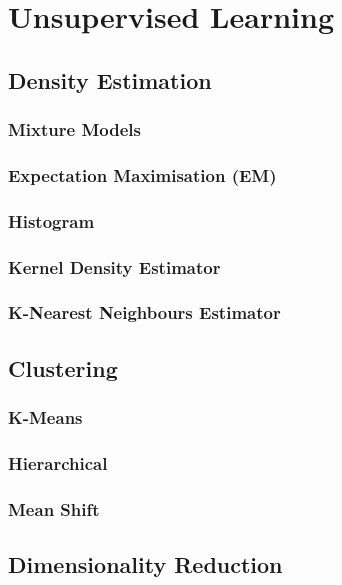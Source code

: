 \section{Unsupervised Learning}

\subsection{Density Estimation}

\subsubsection{Mixture Models}

\subsubsection{Expectation Maximisation (EM)}

\subsubsection{Histogram}

\subsubsection{Kernel Density Estimator}

\subsubsection{K-Nearest Neighbours Estimator}

\subsection{Clustering}

\subsubsection{K-Means}

\subsubsection{Hierarchical}

\subsubsection{Mean Shift}

\subsection{Dimensionality Reduction}

